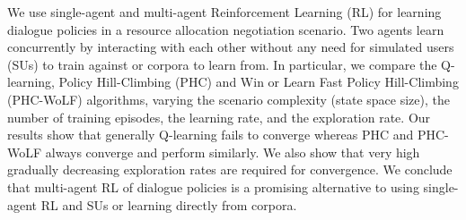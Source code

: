 We use single-agent and multi-agent Reinforcement Learning (RL) for learning dialogue policies in a resource allocation negotiation scenario. Two agents learn concurrently by interacting with each other without any need for simulated users (SUs) to train against or corpora to learn from. In particular, we compare the Q-learning, Policy Hill-Climbing (PHC) and Win or Learn Fast Policy Hill-Climbing (PHC-WoLF) algorithms, varying the scenario complexity (state space size), the number of training episodes, the learning rate, and the exploration rate. Our results show that generally Q-learning fails to converge whereas PHC and PHC-WoLF always converge and perform similarly. We also show that very high gradually decreasing exploration rates are required for convergence. We conclude that multi-agent RL of dialogue policies is a promising alternative to using single-agent RL and SUs or learning directly from corpora.
